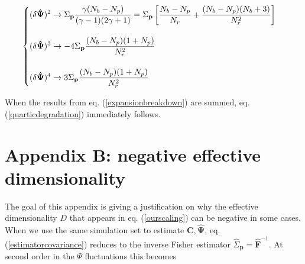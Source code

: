 \documentclass[reprint,aps,prd,superscriptaddress,showkeys,showpacs]{revtex4-1}
\newcommand{\bb}[1]{\mathbf{#1}}
\newcommand{\bbh}[1]{\mathbf{\hat{#1}}}
\newcommand{\h}[1]{\hat{#1}}
\begin{document}
\begin{widetext}
\begin{equation}
\label{expansionbreakdown}
\begin{cases}
\begin{displaystyle}
(\delta\bbh{\Psi})^2 \rightarrow \Sigma_\bb{p}\frac{\gamma(N_b-N_p)}{(\gamma-1)(2\gamma+1)} = \Sigma_\bb{p}\left[\frac{N_b-N_p}{N_r}+\frac{(N_b-N_p)(N_b+3)}{N_r^2}\right]
\end{displaystyle} \\ \\

\begin{displaystyle}
(\delta\bbh{\Psi})^3 \rightarrow -4\Sigma_\bb{p}\frac{(N_b-N_p)(1+N_p)}{N_r^2}
\end{displaystyle} \\ \\


\begin{displaystyle}
(\delta\bbh{\Psi})^4 \rightarrow 3\Sigma_\bb{p}\frac{(N_b-N_p)(1+N_p)}{N_r^2}
\end{displaystyle}

\end{cases}
\end{equation}
\end{widetext}
%
When the results from eq. (\ref{expansionbreakdown}) are summed, eq. (\ref{quarticdegradation}) immediately follows. 


\clearpage
\newpage
\section*{Appendix B: negative effective dimensionality}
\label{appendixB}

The goal of this appendix is giving a justification on why the effective dimensionality $D$ that appears in eq. (\ref{ourscaling}) can be negative in some cases. When we use the same simulation set to estimate $\bb{C},\bbh{\Psi}$, eq. (\ref{estimatorcovariance}) reduces to the inverse Fisher estimator $\h{\Sigma}_\bb{p}=\bbh{F}^{-1}$. At second order in the $\Psi$ fluctuations this becomes
\end{document}
